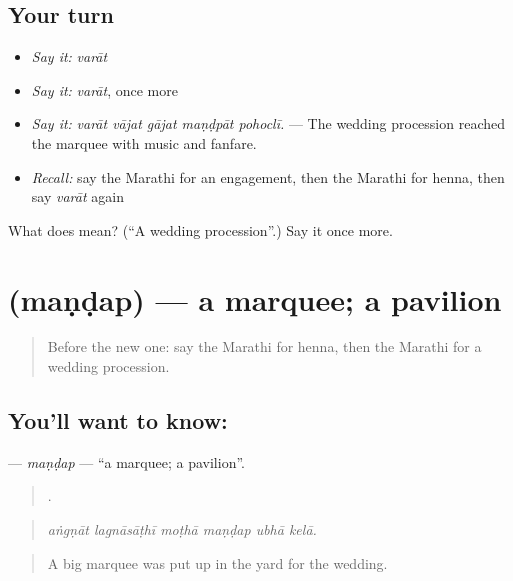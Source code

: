 \subsection*{Your turn}
\begin{itemize}
\raggedright
  \item \emph{Say it:} \emph{varāt}
  \item \emph{Say it:} \emph{varāt}, once more
  \item \emph{Say it:} \emph{varāt vājat gājat maṇḍpāt pohoclī.} — The wedding procession reached the marquee with music and fanfare.
  \item \emph{Recall:} say the Marathi for an engagement, then the Marathi for henna, then say \emph{varāt} again
\end{itemize}

\begin{tcolorbox}[breakable,colback=teal!4,colframe=teal!35!black,title={Before you move on}]
What does  mean? (\textquotedblleft{}A wedding procession\textquotedblright{}.) Say it once more.
\end{tcolorbox}
\section[\texorpdfstring{\mr{मंडप} (maṇḍap)}{मंडप (maṇḍap)}]{ (maṇḍap) — a marquee; a pavilion}

\label{lesson:MR-C316-mandap}



\begin{quote}
Before the new one: say the Marathi for henna, then the Marathi for a wedding procession.
\end{quote}

\subsection*{You'll want to know: }
\textbf{} — \emph{maṇḍap} — \textquotedblleft{}a marquee; a pavilion\textquotedblright{}.

\begin{quote}
     .
\end{quote}

\begin{quote}
\emph{aṅgṇāt lagnāsāṭhī moṭhā maṇḍap ubhā kelā.}
\end{quote}

\begin{quote}
A big marquee was put up in the yard for the wedding.
\end{quote}

